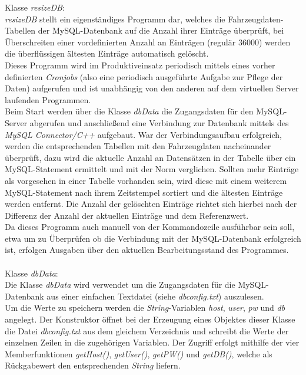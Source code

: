\documentclass[fontsize = 12pt, paper = a4]{scrreprt}
\begin{document}
Klasse \textit{resizeDB}:\\
\textit{resizeDB} stellt ein eigenständiges Programm dar, welches die Fahrzeugdaten-Tabellen der MySQL-Datenbank auf die Anzahl ihrer Einträge überprüft, bei Überschreiten einer vordefinierten Anzahl an Einträgen (regulär 36000) werden die überflüssigen ältesten Einträge automatisch gelöscht.\\
Dieses Programm wird im Produktiveinsatz periodisch mittels eines vorher definierten \textit{Cronjobs} (also eine periodisch ausgeführte Aufgabe zur Pflege der Daten) aufgerufen und ist unabhängig von den anderen auf dem virtuellen Server laufenden Programmen.\\
Beim Start werden über die Klasse \textit{dbData} die Zugangsdaten für den MySQL-Server abgerufen und anschließend eine Verbindung zur Datenbank mittels des \textit{MySQL Connector/C++} aufgebaut.
War der Verbindungsaufbau erfolgreich, werden die entsprechenden Tabellen mit den Fahrzeugdaten nacheinander überprüft, dazu wird die aktuelle Anzahl an Datensätzen in der Tabelle über ein MySQL-Statement ermittelt und mit der Norm verglichen.
Sollten mehr Einträge als vorgesehen in einer Tabelle vorhanden sein, wird diese mit einem weiterem MySQL-Statement nach ihrem Zeitstempel sortiert und die ältesten Einträge werden entfernt.
Die Anzahl der gelöschten Einträge richtet sich hierbei nach der Differenz der Anzahl der aktuellen Einträge und dem Referenzwert.\\
Da dieses Programm auch manuell von der Kommandozeile ausführbar sein soll, etwa um zu Überprüfen ob die Verbindung mit der MySQL-Datenbank erfolgreich ist, erfolgen Ausgaben über den aktuellen Bearbeitungsstand des Programmes.\\
\\
Klasse \textit{dbData}:\\
Die Klasse \textit{dbData} wird verwendet um die Zugangsdaten für die MySQL-Datenbank aus einer einfachen Textdatei (siehe \textit{dbconfig.txt}) auszulesen.\\
Um die Werte zu speichern werden die \textit{String}-Variablen \textit{host}, \textit{user}, \textit{pw} und \textit{db} angelegt. Der Konstruktor öffnet bei der Erzeugung eines Objektes dieser Klasse die Datei \textit{dbconfig.txt} aus dem  gleichem Verzeichnis und schreibt die Werte der einzelnen Zeilen in die zugehörigen Variablen.
Der Zugriff erfolgt mithilfe der vier Memberfunktionen \textit{getHost()}, \textit{getUser()}, \textit{getPW()} und \textit{getDB()}, welche als Rückgabewert den entsprechenden \textit{String} liefern.
\end{document}
